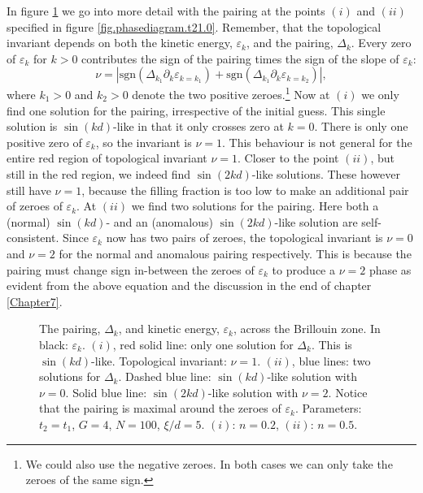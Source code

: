In figure \ref{fig.Deltaexamples.t21.0} we go into more detail with the pairing at the points $(i)$ and $(ii)$ specified in figure \ref{fig.phasediagram.t21.0}. Remember, that the topological invariant depends on both the kinetic energy, $\varepsilon_k$, and the pairing, $\Delta_k$. Every zero of $\varepsilon_k$ for $k > 0$ contributes the sign of the pairing times the sign of the slope of $\varepsilon_k$:
\begin{equation}
\nu = \left| \text{sgn}\left(\Delta_{k_1}\partial_k\varepsilon_{k = k_1}\right) + \text{sgn}\left(\Delta_{k_1}\partial_k\varepsilon_{k = k_2}\right)\right|, \nonumber
\end{equation}
where $k_1 > 0$ and $k_2 > 0$ denote the two positive zeroes.\footnote{We could also use the negative zeroes. In both cases we can only take the zeroes of the same sign.} Now at $(i)$ we only find one solution for the pairing, irrespective of the initial guess. This single solution is $\sin(kd)$-like in that it only crosses zero at $k = 0$. There is only one positive zero of $\varepsilon_k$, so the invariant is $\nu = 1$. This behaviour is not general for the entire red region of topological invariant $\nu = 1$. Closer to the point $(ii)$, but still in the red region, we indeed find $\sin(2kd)$-like solutions. These however still have $\nu = 1$, because the filling fraction is too low to make an additional pair of zeroes of $\varepsilon_k$. At $(ii)$ we find two solutions for the pairing. Here both a (normal) $\sin(kd)$- and an (anomalous) $\sin(2kd)$-like solution are self-consistent. Since $\varepsilon_k$ now has two pairs of zeroes, the topological invariant is $\nu = 0$ and $\nu = 2$ for the normal and anomalous pairing respectively. This is because the pairing must change sign in-between the zeroes of $\varepsilon_k$ to produce a $\nu = 2$ phase as evident from the above equation and the discussion in the end of chapter \ref{Chapter7}. 

\begin{figure}
\begin{center}

\caption{The pairing, $\Delta_k$, and kinetic energy, $\varepsilon_k$, across the Brillouin zone. In black: $\varepsilon_k$. $(i)$, red solid line: only one solution for $\Delta_k$. This is $\sin(kd)$-like. Topological invariant: $\nu = 1$. $(ii)$, blue lines: two solutions for $\Delta_k$. Dashed blue line: $\sin(kd)$-like solution with $\nu = 0$. Solid blue line: $\sin(2kd)$-like solution with $\nu = 2$. Notice that the pairing is maximal around the zeroes of $\varepsilon_k$. Parameters: $t_2 = t_1$, $G = 4$, $N = 100$, $\xi / d = 5$. $(i)$: $n = 0.2$, $(ii)$: $n = 0.5$.}
\label{fig.Deltaexamples.t21.0}
\end{center}
\end{figure}

